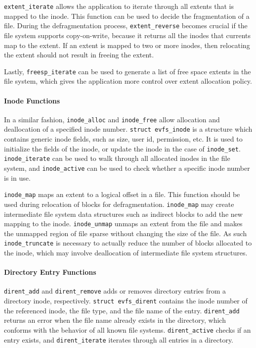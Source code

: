 %
\texttt{extent\_iterate} allows the application to iterate through all extents that is mapped to the inode. This function can be used to decide the fragmentation of a file. During the defragmentation process, \texttt{extent\_reverse} becomes crucial if the file system supports copy-on-write, because it returns all the inodes that currents map to the extent. If an extent is mapped to two or more inodes, then relocating the extent should not result in freeing the extent. 

Lastly, \texttt{freesp\_iterate} can be used to generate a list of free space extents in the file system, which gives the application more control over extent allocation policy.

\paragraph{Inode Functions} In a similar fashion, \texttt{inode\_alloc} and \texttt{inode\_free} allow allocation and deallocation of a specified inode number. \texttt{struct evfs\_inode} is a structure which contains generic inode fields, such as size, user id, permission, etc. It is used to initialize the fields of the inode, or update the inode in the case of \texttt{inode\_set}. \texttt{inode\_iterate} can be used to walk through all allocated inodes in the file system, and \texttt{inode\_active} can be used to check whether a specific inode number is in use. 

\texttt{inode\_map} maps an extent to a logical offset in a file. This function should be used during relocation of blocks for defragmentation. \texttt{inode\_map} may create intermediate file system data structures such as indirect blocks to add the new mapping to the inode. \texttt{inode\_unmap} unmaps an extent from the file and makes the unmapped region of file sparse without changing the size of the file. As such \texttt{inode\_truncate} is necessary to actually reduce the number of blocks allocated to the inode, which may involve deallocation of intermediate file system structures.

\paragraph{Directory Entry Functions} \texttt{dirent\_add} and \texttt{dirent\_remove} adds or removes directory entries from a directory inode, respectively. \texttt{struct evfs\_dirent} contains the inode number of the referenced inode, the file type, and the file name of the entry. \texttt{dirent\_add} returns an error when the file name already exists in the directory, which conforms with the behavior of all known file systems. \texttt{dirent\_active} checks if an entry exists, and \texttt{dirent\_iterate} iterates through all entries in a directory. 

